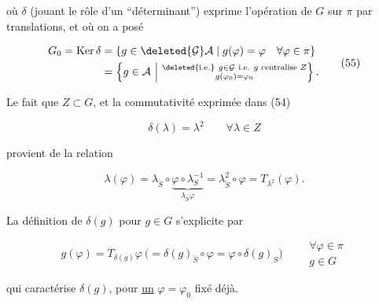 

où $\delta$ (jouant le rôle d'un \textquotedblleft{}déterminant\textquotedblright) exprime l'opération de $G$ sur $\pi$ par translations, et où on a posé

\[
\begin{aligned}
G_0=\mathrm{Ker}\,\delta&=\{g\in\deleted{\mathcal G}\mathcal A\mid g(\varphi)=\varphi\quad\forall\varphi\in\pi\}\\
&=\left\{g\in\mathcal A\ \middle|\ \substack{\deleted{\text{i.e.}}\ g\in\mathcal G\ \text{i.e. }g\text{ centralise }Z\\g(\varphi_0)=\varphi_0}\right\}.
\end{aligned}
\tag*{(55)}
\]


Le fait que $Z\subset G$, et la commutativité exprimée dans (54)

\[
\delta(\lambda)=\lambda^2\qquad\forall\lambda\in Z
\tag*{(56)}
\]

provient de la relation

\[
\lambda(\varphi)=\lambda_{\check S}\circ\underbrace{\varphi\circ\lambda_S^{-1}}_{\lambda_{\check S}\varphi}=\lambda_{\check S}^{2}\circ\varphi=T_{\lambda^2}(\varphi).
\]

La définition de $\delta(g)$ pour $g\in G$ s'explicite par

\[
g(\varphi)=T_{\delta(g)}\varphi\ \bigl(=\delta(g)_{\check S}\circ\varphi=\varphi\circ\delta(g)_S\bigr)\qquad\substack{\forall\varphi\in\pi\\g\in G}
\tag*{(57)}
\]

qui caractérise \deleted{\unsure{$\forall$}} $\delta(g)$, pour \uline{un} $\varphi=\varphi_0$ fixé déjà.

